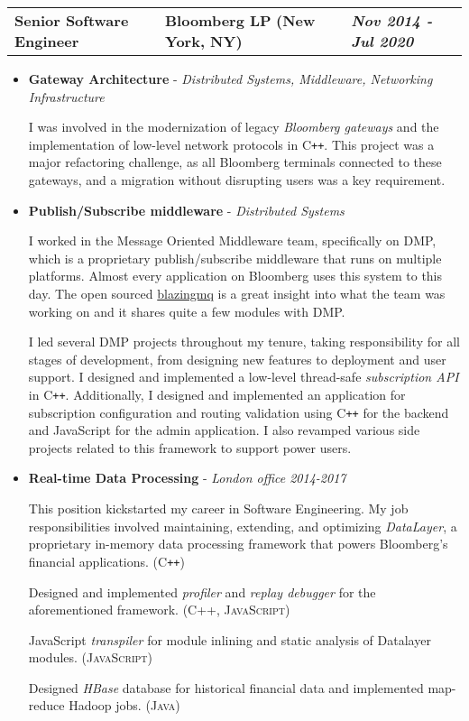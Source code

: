 \documentclass[a4paper,10pt]{article}
\newcommand*{\mahogany}{\textcolor{darkmahogany}}
\newcommand{\jobtitle}[4]{
\vspace{0.3cm}
\begin{tabularx}
{\textwidth}
{ >{\raggedright\arraybackslash}p{6.5cm}
  >{\raggedright\arraybackslash}X
  >{\raggedleft\arraybackslash}p{4cm} }
\fontsize{13pt}{15pt}\selectfont\textbf{#1} &

\large\textbf{\mahogany{#2}} \normalsize\textbf{(#3)} &
\textit{\large\textbf{#4}}
\end{tabularx}
\vspace{-0.4cm}
}
\begin{document}
\jobtitle{Senior Software Engineer}{Bloomberg LP}{New York, NY}{Nov 2014 - Jul 2020}
\begin{itemize}[leftmargin=.27in,label=] \setlength\itemsep{-0.1cm}
	\item \textbf{Gateway Architecture} - \textit{Distributed Systems, Middleware, Networking Infrastructure}

I was involved in the modernization of legacy \textit{Bloomberg gateways}
and the implementation of low-level network protocols in \textsc{C\texttt{++}}.
This project was a major refactoring challenge,
as all Bloomberg terminals connected to these gateways, and a migration without disrupting users was a key requirement.


    \vspace{0.2cm}
    \item \textbf{Publish/Subscribe middleware} - \textit{Distributed Systems}

I worked in the Message Oriented Middleware team, specifically on DMP, which is a proprietary publish/subscribe middleware that runs on multiple platforms. Almost every application on Bloomberg uses this system to this day.
The open sourced \href{https://bloomberg.github.io/blazingmq/}{blazingmq} is a great insight into what the team was working on and it shares quite a few modules with DMP.

I led several DMP projects throughout my tenure, taking responsibility for all stages of development, from designing new features to deployment and user support.
I designed and implemented a low-level thread-safe \textit{subscription API} in \textsc{C\texttt{++}}.
Additionally, I designed and implemented an application for subscription configuration and routing validation using \textsc{C\texttt{++}} for the backend and JavaScript for the admin application.
I also revamped various side projects related to this framework to support power users.

    \vspace{0.2cm}
    \item \textbf{Real-time Data Processing} - \textit{London office 2014-2017}

This position kickstarted my career in Software Engineering.
My job responsibilities involved maintaining, extending, and optimizing \textit{DataLayer},
a proprietary in-memory data processing framework that powers Bloomberg's financial applications. \textsc{(C\texttt{++})}

    Designed and implemented \textit{profiler} and \textit{replay debugger} for the aforementioned framework. \textsc{(C++, JavaScript)}

    JavaScript \textit{transpiler} for module inlining and static analysis of Datalayer modules. \textsc{(JavaScript)}

    Designed \textit{HBase} database for historical financial data and implemented map-reduce Hadoop jobs. \textsc{(Java)}
\end{itemize}
\end{document}
